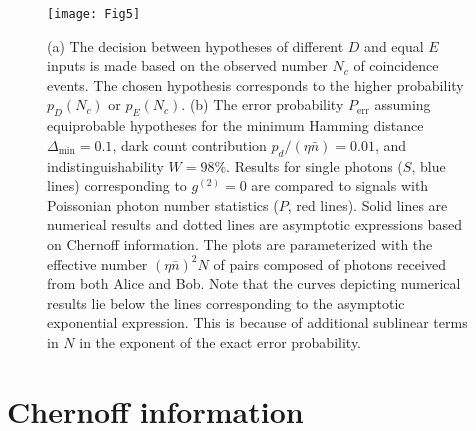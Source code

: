 \documentclass[10pt]{article}
\begin{document}
\begin{figure}
\texttt{[image: Fig5]}\centering\caption{(a) The decision between hypotheses of different $D$ and equal $E$ inputs is made based on the observed number $N_c$ of coincidence events. The chosen hypothesis corresponds to the higher probability $p_D(N_c)$ or $p_E(N_c)$. (b) The error probability $P_{\text{err}}$ assuming equiprobable hypotheses for the minimum Hamming distance $\Delta_{\mathrm{min}}=0.1$, dark count contribution $p_d/(\eta\bar{n}) = 0.01$, and indistinguishability $W=98\%$. Results for single photons ($S$, blue lines) corresponding to $g^{(2)}=0$ are compared to signals with Poissonian photon number statistics ($P$, red lines). Solid lines are numerical results and dotted lines are asymptotic expressions based on Chernoff information. The plots are parameterized with the effective number $(\eta\bar{n})^2 N$ of pairs composed of photons received from both Alice and Bob. Note that the curves depicting numerical results lie below the lines corresponding to the asymptotic exponential expression. This is because of additional sublinear terms in $N$ in the exponent of the exact error probability.\label{fig:Chernoff_method}}
\end{figure}

\section{Chernoff information}
\label{Sec:Chernoff}
\end{document}
